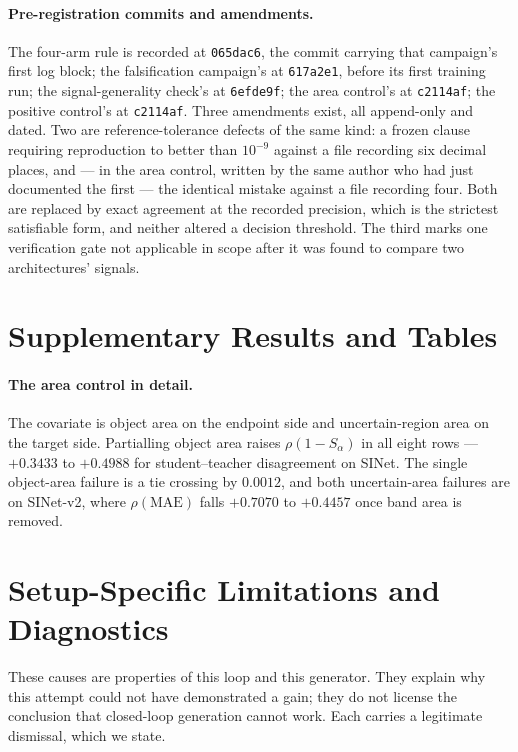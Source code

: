 \documentclass{article} %
\begin{document}
\paragraph{Pre-registration commits and amendments.} The four-arm rule is recorded at
\texttt{065dac6}, the commit carrying that campaign's first log block; the falsification campaign's at
\texttt{617a2e1}, before its first training run; the signal-generality check's at \texttt{6efde9f};
the area control's at \texttt{c2114af}; the positive control's at \texttt{c2114af}. Three amendments
exist, all append-only and dated. Two are reference-tolerance defects of the same kind: a frozen clause
requiring reproduction to better than $10^{-9}$ against a file recording six decimal places, and --- in
the area control, written by the same author who had just documented the first --- the identical
mistake against a file recording four. Both are replaced by exact agreement at the recorded precision,
which is the strictest satisfiable form, and neither altered a decision threshold. The third marks one
verification gate not applicable in scope after it was found to compare two architectures' signals.

\section{Supplementary Results and Tables}
\label{app:tables}

\paragraph{The area control in detail.} The covariate is object area on the endpoint side and
uncertain-region area on the target side. Partialling object area raises $\rho(1-S_\alpha)$ in all
eight rows --- $+0.3433$ to $+0.4988$ for student--teacher disagreement on SINet. The single
object-area failure is a tie crossing by $0.0012$, and both uncertain-area failures are on SINet-v2,
where $\rho(\mathrm{MAE})$ falls $+0.7070$ to $+0.4457$ once band area is removed.



\section{Setup-Specific Limitations and Diagnostics}
\label{app:tier1}

These causes are properties of this loop and this generator. They explain why this
attempt could not have demonstrated a gain; they do not license the conclusion that closed-loop
generation cannot work. Each carries a legitimate dismissal, which we state.
\end{document}
